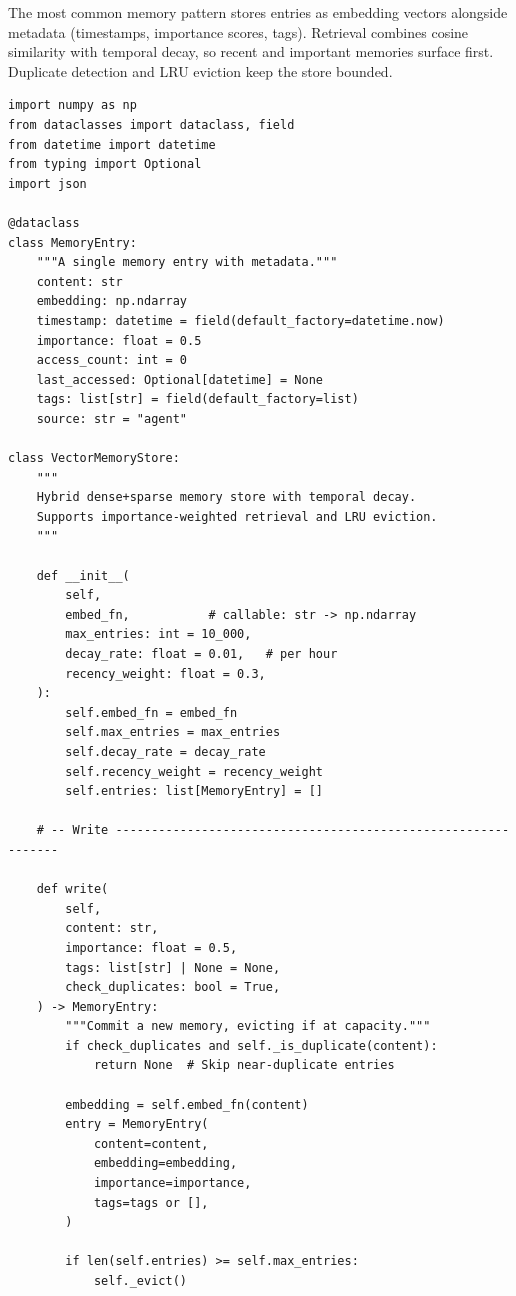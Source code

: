 The most common memory pattern stores entries as embedding vectors alongside metadata (timestamps, importance scores, tags). Retrieval combines cosine similarity with temporal decay, so recent and important memories surface first. Duplicate detection and LRU eviction keep the store bounded.

\begin{lstlisting}[style=pythonstyle, caption={Vector store memory with embeddings, importance scoring, and hybrid retrieval.}]
import numpy as np
from dataclasses import dataclass, field
from datetime import datetime
from typing import Optional
import json

@dataclass
class MemoryEntry:
    """A single memory entry with metadata."""
    content: str
    embedding: np.ndarray
    timestamp: datetime = field(default_factory=datetime.now)
    importance: float = 0.5
    access_count: int = 0
    last_accessed: Optional[datetime] = None
    tags: list[str] = field(default_factory=list)
    source: str = "agent"

class VectorMemoryStore:
    """
    Hybrid dense+sparse memory store with temporal decay.
    Supports importance-weighted retrieval and LRU eviction.
    """

    def __init__(
        self,
        embed_fn,           # callable: str -> np.ndarray
        max_entries: int = 10_000,
        decay_rate: float = 0.01,   # per hour
        recency_weight: float = 0.3,
    ):
        self.embed_fn = embed_fn
        self.max_entries = max_entries
        self.decay_rate = decay_rate
        self.recency_weight = recency_weight
        self.entries: list[MemoryEntry] = []

    # -- Write --------------------------------------------------------------

    def write(
        self,
        content: str,
        importance: float = 0.5,
        tags: list[str] | None = None,
        check_duplicates: bool = True,
    ) -> MemoryEntry:
        """Commit a new memory, evicting if at capacity."""
        if check_duplicates and self._is_duplicate(content):
            return None  # Skip near-duplicate entries

        embedding = self.embed_fn(content)
        entry = MemoryEntry(
            content=content,
            embedding=embedding,
            importance=importance,
            tags=tags or [],
        )

        if len(self.entries) >= self.max_entries:
            self._evict()


\end{lstlisting}
